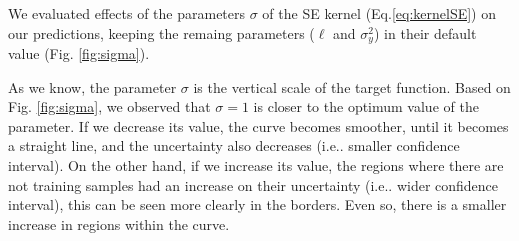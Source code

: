 \documentclass{article}
\makeatletter
\DeclareRobustCommand\onedot{\futurelet\@let@token\@onedot}
\def\@onedot{\ifx\@let@token.\else.\null\fi\xspace}
\def\ie{i.e\onedot} \def\Ie{I.e\onedot}
\makeatother
\begin{document}
We evaluated effects of the parameters $\sigma$ of the SE kernel (Eq.\eqref{eq:kernelSE}) on our predictions, keeping the remaing parameters ($\ell$ and $\sigma_y^2$) in their default value (Fig. \ref{fig:sigma}).

As we know, the parameter $\sigma$ is the vertical scale of the target function. Based on Fig. \ref{fig:sigma}, we observed that $\sigma = 1$ is closer to the optimum value of the parameter. If we decrease its value, the curve becomes smoother, until it becomes a straight line, and the uncertainty also decreases (\ie smaller confidence interval). On the other hand, if we increase its value, the regions where there are not training samples had an increase on their uncertainty (\ie wider confidence interval), this can be seen more clearly in the borders. Even so, there is a smaller increase in regions within the curve.
\end{document}

